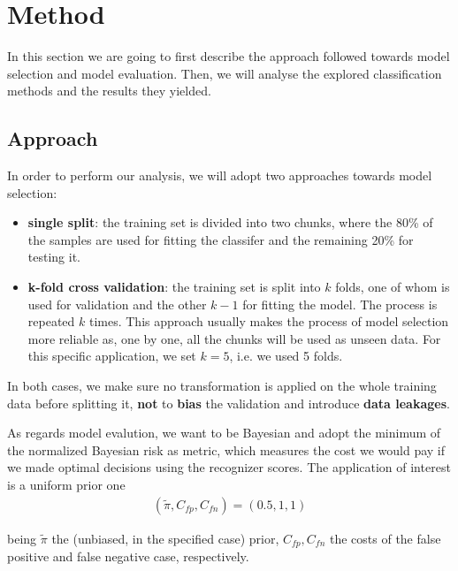 \section{Method}
In this section we are going to first describe the approach followed towards model selection and model evaluation. Then, we will analyse the explored classification methods and the results they yielded.
 
\subsection{Approach}
In order to perform our analysis, we will adopt two approaches towards model selection:
\begin{itemize}
	\item \textbf{single split}: the training set is divided into two chunks, where the 80\% of the samples are used for fitting the classifer and the remaining 20\% for testing it. 
	\item \textbf{k-fold cross validation}: the training set is split into $k$ folds, one of whom is used for validation and the other $k - 1$ for fitting the model. The process is repeated $k$ times. This approach usually makes the process of model selection more reliable as, one by one, all the chunks will be used as unseen data. 
	For this specific application, we set $k = 5$, i.e. we used 5 folds. 
\end{itemize}
In both cases, we make sure no transformation is applied on the whole training data before splitting it, \textbf{not} to \textbf{bias} the validation and introduce \textbf{data leakages}.  

As regards model evalution, we want to be Bayesian and adopt the minimum of the normalized Bayesian risk as metric, which measures the cost we would pay if we made optimal decisions using the recognizer scores. The application of interest is a uniform prior one
\begin{align*}
	(\tilde{\pi}, C_{fp}, C_{fn}) = (0.5, 1, 1)
\end{align*}

being $\tilde{\pi}$ the (unbiased, in the specified case) prior, $C_{fp}, C_{fn}$ the costs of the false positive and false negative case, respectively.


